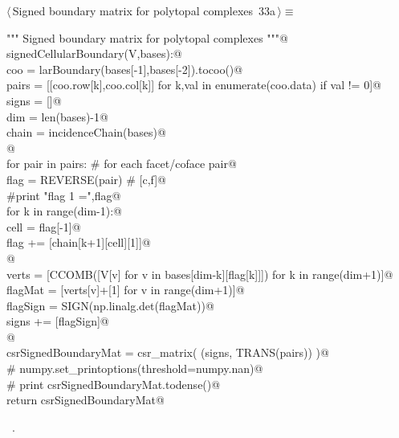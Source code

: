 \documentclass[11pt,oneside]{article}    %
\begin{document}
\begin{flushleft} \small \label{scrap53}
\protect{}$\langle\,$Signed boundary matrix for polytopal complexes\nobreak\ {\footnotesize 33a}$\,\rangle\equiv$
\vspace{-1ex}
\begin{list}{}{} \item
\mbox{}\verb@""" Signed boundary matrix for polytopal complexes """@\\
\mbox{}\verb@def signedCellularBoundary(V,bases):@\\
\mbox{}\verb@    coo = larBoundary(bases[-1],bases[-2]).tocoo()@\\
\mbox{}\verb@    pairs = [[coo.row[k],coo.col[k]] for k,val in enumerate(coo.data) if val != 0]@\\
\mbox{}\verb@    signs = []@\\
\mbox{}\verb@    dim = len(bases)-1@\\
\mbox{}\verb@    chain = incidenceChain(bases)@\\
\mbox{}\verb@    @\\
\mbox{}\verb@    for pair in pairs:        # for each facet/coface pair@\\
\mbox{}\verb@        flag = REVERSE(pair) #  [c,f]@\\
\mbox{}\verb@        #print "flag 1 =",flag@\\
\mbox{}\verb@        for k in range(dim-1):@\\
\mbox{}\verb@            cell = flag[-1]@\\
\mbox{}\verb@            flag += [chain[k+1][cell][1]]@\\
\mbox{}\verb@        @\\
\mbox{}\verb@        verts = [CCOMB([V[v] for v in bases[dim-k][flag[k]]]) for k in range(dim+1)]@\\
\mbox{}\verb@        flagMat = [verts[v]+[1] for v in range(dim+1)]@\\
\mbox{}\verb@        flagSign = SIGN(np.linalg.det(flagMat))@\\
\mbox{}\verb@        signs += [flagSign]@\\
\mbox{}\verb@    @\\
\mbox{}\verb@    csrSignedBoundaryMat = csr_matrix( (signs, TRANS(pairs)) )@\\
\mbox{}\verb@    # numpy.set_printoptions(threshold=numpy.nan)@\\
\mbox{}\verb@    # print csrSignedBoundaryMat.todense()@\\
\mbox{}\verb@    return csrSignedBoundaryMat@\\
\mbox{}\verb@@{\NWsep}
\end{list}
\vspace{-1ex}
\footnotesize\addtolength{\baselineskip}{-1ex}
\begin{list}{}{\setlength{\itemsep}{-\parsep}\setlength{\itemindent}{-\leftmargin}}
\item \NWtxtMacroRefIn\ .
\end{list}
\end{flushleft}
\end{document}
